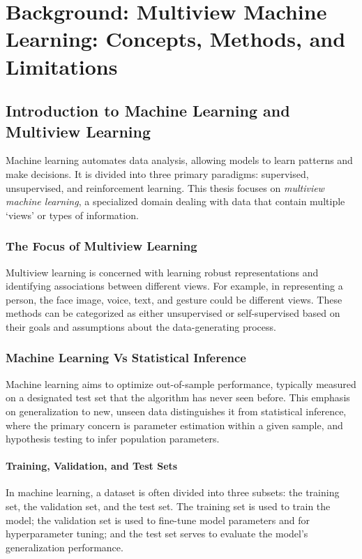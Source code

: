\chapter{Background: Multiview Machine Learning: Concepts, Methods, and Limitations}
\label{chap:background}
\minitoc
\section{Introduction to Machine Learning and Multiview Learning}

Machine learning automates data analysis, allowing models to learn patterns and make decisions. It is divided into three primary paradigms: supervised, unsupervised, and reinforcement learning. This thesis focuses on \textit{multiview machine learning}, a specialized domain dealing with data that contain multiple `views' or types of information. 

\subsection{The Focus of Multiview Learning}

Multiview learning is concerned with learning robust representations and identifying associations between different views. For example, in representing a person, the face image, voice, text, and gesture could be different views. These methods can be categorized as either unsupervised or self-supervised based on their goals and assumptions about the data-generating process.

\subsection{Machine Learning Vs Statistical Inference}
Machine learning aims to optimize out-of-sample performance, typically measured on a designated test set that the algorithm has never seen before. This emphasis on generalization to new, unseen data distinguishes it from statistical inference, where the primary concern is parameter estimation within a given sample, and hypothesis testing to infer population parameters.

\subsubsection{Training, Validation, and Test Sets}

In machine learning, a dataset is often divided into three subsets: the training set, the validation set, and the test set. The training set is used to train the model; the validation set is used to fine-tune model parameters and for hyperparameter tuning; and the test set serves to evaluate the model's generalization performance. 

